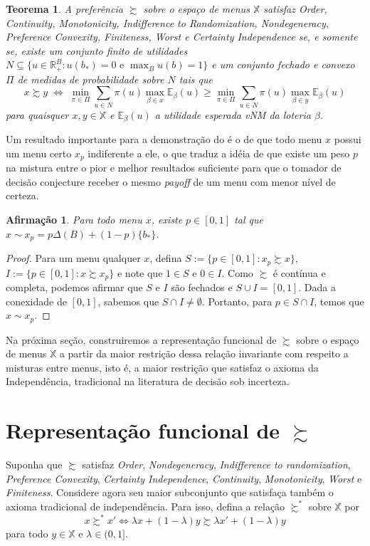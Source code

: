 \documentclass[12pt, a4paper]{article}
\theoremstyle{nonumberplain}
\newtheorem{proof}{Dem.}
\theoremstyle{plain}
\newtheorem{theorem}{Teorema}
\theoremstyle{plain}
\newtheorem{claim}{Afirmação}
\theoremstyle{plain}
\theoremstyle{nonumberplain}
\begin{document}
\begin{theorem} \label{nossoteorema} A preferência $\succsim$ sobre o espaço de menus $\mathbb{X}$ satisfaz \emph{Order}, \emph{Continuity}, \emph{Monotonicity}, \emph{Indifference to Randomization}, \emph{Nondegeneracy}, \emph{Preference Convexity}, \emph{Finiteness}, \emph{Worst} e \emph{Certainty Independence} se, e somente se, existe um conjunto finito de utilidades $N\subseteq \{u \in \mathbb{R}^B_+:u(b_*)=0\text { e }\max_{B}u(b)=1\}$ e um conjunto fechado e convexo $\Pi$ de medidas de probabilidade sobre $N$ tais que
\[x \succsim y \;\Leftrightarrow\; \min_{\pi\in\Pi}\sum_{u\in N} \pi(u)\max_{\beta\in x}\mathbb{E}_\beta(u)\geq \min_{\pi\in\Pi}\sum_{u\in N} \pi(u)\max_{\beta\in y}\mathbb{E}_\beta(u)\]
para quaisquer $x,y\in\mathbb{X}$ e $\mathbb{E}_\beta(u)$ a utilidade esperada vNM
da loteria $\beta$. \end{theorem}
Um resultado importante para a demonstração do  é o de que todo menu $x$ possui um menu certo $x_p$ indiferente a ele, o que traduz a idéia de que existe um peso $p$ na mistura entre o pior e melhor resultados suficiente para que o tomador de decisão conjecture receber o mesmo \emph{payoff} de um menu com menor nível de certeza.
\begin{claim}\label{menucertoind} Para todo menu $x$, existe $p\in[0,1]$ tal que $x\sim x_p=p\Delta(B)+(1-p)\{b_*\}$. \end{claim}
\begin{proof}
Para um menu qualquer $x$, defina $S:=\{p\in[0,1] : x_p\succsim x\}$, $I:=\{p\in[0,1] : x\succsim x_p\}$ e note que $1\in S$ e $0\in I$. Como $\succsim$ é contínua e completa, podemos afirmar que $S$ e $I$ são fechados e $S\cup I=[0,1]$. Dada a conexidade de $[0,1]$, sabemos que $S\cap I\neq \emptyset$. Portanto, para $p\in S\cap I$, temos que $x\sim x_p$.
\end{proof}

Na próxima seção, construiremos a representação funcional de $\succsim$ sobre o espaço de menus $\mathbb{X}$ a partir da maior restrição dessa relação invariante com respeito a misturas entre menus, isto é, a maior restrição que satisfaz o axioma da Independência, tradicional na literatura de decisão sob incerteza.
\clearpage
\section{Representação funcional de $\succsim$}
Suponha que $\succsim$ satisfaz \textit{Order}, \textit{Nondegeneracy}, \textit{Indifference to randomization}, \textit{Preference Convexity}, \textit{Certainty Independence}, \textit{Continuity}, \textit{Monotonicity}, \textit{Worst} e \textit{Finiteness}. Considere agora seu maior subconjunto que satisfaça também o axioma tradicional de independência. Para isso, defina a relação $\succsim^*$ sobre $\mathbb{X}$ por $$x\succsim^* x' \Leftrightarrow \lambda x + (1-\lambda)y \succsim \lambda x' + (1-\lambda)y$$ para todo $y\in \mathbb{X}$ e $\lambda\in(0,1]$.
\end{document}
